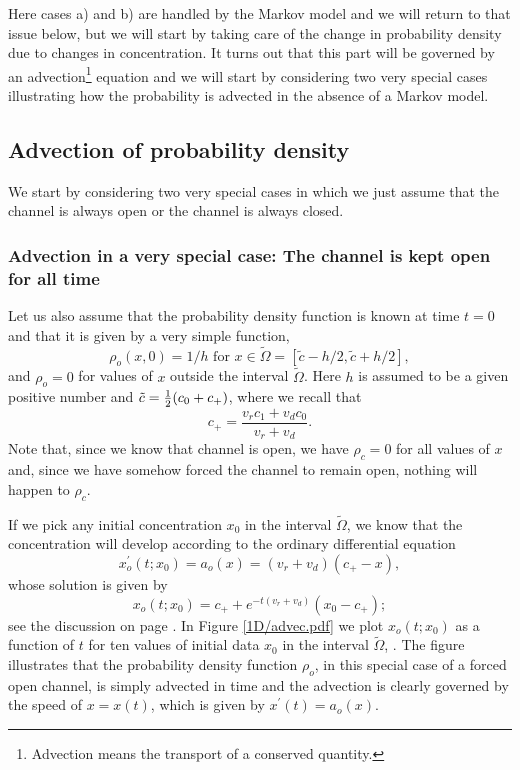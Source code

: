 Here cases a) and b) are handled by the Markov model and we will return to
that issue below, but we will start by taking care of the change in
probability density due to changes in concentration. It turns out that this part will be governed by an advection\footnote{Advection means the transport of a conserved quantity.} equation and we will start by considering two very special cases illustrating how the probability is advected in the absence of a Markov model. 

\subsection{Advection of probability density\label{advectprobability}}

We start by considering two very special cases in which we just assume that the channel is always open or the channel is always closed. 

\subsubsection{Advection in a very special case: The channel is kept open for all time}
 Let us also assume that the probability density function is known at time $t=0$ and that it is given by a very simple function,
\begin{equation}
 \rho_o (x,0)=1/h \text{ for } x\in \tilde{\Omega} = [\tilde{c}-h/2,\tilde{c}+h/2 ],  \label{adv_ode_open_init}
 \end{equation}
and $\rho_o=0$ for values of $x$ outside the interval $\tilde{\Omega}$. Here $h$ is assumed to be a given positive number and $\tilde{c}=\frac{1}{2} (c_0+c_+)$, where we recall that
\[
c_{+}=\frac{v_{r}c_{1}+v_{d}c_{0}}{v_{r}+v_{d}}.%
\]
Note that, since we know that  channel is open, we have $\rho_c=0$ for all values of $x$ and, since we have somehow forced the channel to remain open, nothing will happen to $\rho_c$. 

If we pick any initial concentration $x_0$ in the interval
$\tilde{\Omega}$, we know that the concentration will develop according to the ordinary differential equation
\begin{equation}
x^{\prime}_o(t;x_0)=a_o(x)=(v_{r}+v_{d})\left(c_{+}-x\right), \label{adv_ode_open}
\end{equation}
whose solution is given by
\[
x_o(t;x_0)=c_{+}+e^{-t\left(  v_{r}+v_{d}\right)}\left(  x_{0}-c_{+}\right);
\]
see the discussion on page \pageref{open600}. In Figure \ref{1D/advec.pdf}
we plot $x_o(t;x_0)$ as a function of $t$ for ten values of initial data $x_0$ in the interval $\tilde{\Omega}$, . The figure illustrates that the probability density function 
$\rho_o$, in this special case of a forced open channel, is simply advected in time and the advection is clearly governed by the speed of $x=x(t)$, which is given by $x^{\prime}(t)=a_o(x)$.

